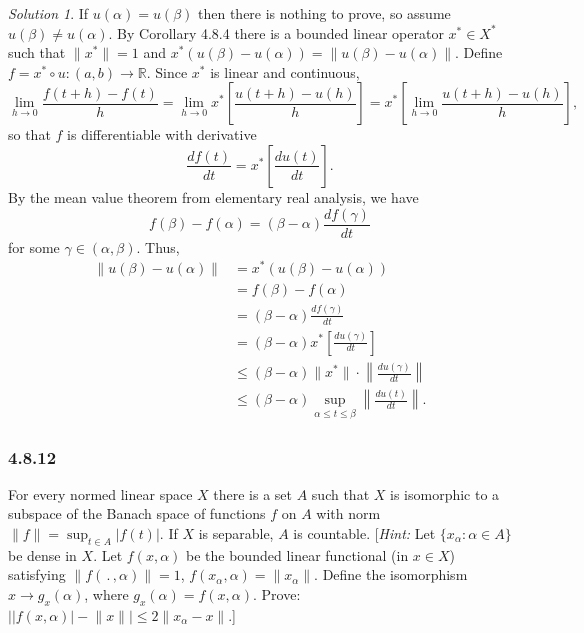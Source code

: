 \documentclass{report}
\newcommand{\bb}[1]{\mathbb{#1}}
\newcommand{\norm}[1]{{\lVert #1 \rVert}}
\newcommand{\snorm}[1]{\left\lVert #1 \right\rVert}
\theoremstyle{remark}
\newtheorem*{solution}{Solution}
\begin{document}
\begin{solution}
  If $u(\alpha) = u(\beta)$ then there is nothing to prove, so assume $u(\beta) \ne u(\alpha)$. By Corollary 4.8.4 there is a bounded linear operator $x^* \in X^*$ such that $\norm{x^*} = 1$ and $x^*(u(\beta) - u(\alpha)) = \norm{u(\beta) - u(\alpha)}$. Define $f = x^* \circ u: (a,b) \to \bb R$. Since $x^*$ is linear and continuous,
  \begin{equation*}
    \lim_{h \to 0} \frac{f(t+h) - f(t)}{h} = \lim_{h \to 0} x^* \left[ \frac{u(t+h) - u(h)}{h} \right] = x^* \left[ \lim_{h \to 0} \frac{u(t+h) - u(h)}{h} \right],
  \end{equation*}
  so that $f$ is differentiable with derivative
  \begin{equation*}
    \frac{df(t)}{dt} = x^* \left[ \frac{du(t)}{dt} \right].
  \end{equation*}
  By the mean value theorem from elementary real analysis, we have
  \begin{equation*}
    f(\beta) - f(\alpha) = (\beta - \alpha) \frac{df(\gamma)}{dt}
  \end{equation*}
  for some $\gamma \in (\alpha, \beta)$. Thus,
  \begin{equation*}
    \begin{split}
      \norm{u(\beta) - u(\alpha)} &= x^*(u(\beta) - u(\alpha)) \\
      &= f(\beta) - f(\alpha) \\
      &= (\beta - \alpha) \frac{df(\gamma)}{dt} \\
      &= (\beta - \alpha) x^* \left[ \frac{du(\gamma)}{dt} \right] \\
      &\le (\beta - \alpha) \norm{x^*} \cdot \snorm{\frac{du(\gamma)}{dt}} \\
      &\le (\beta - \alpha) \sup_{\alpha \le t \le \beta} \snorm{\frac{du(t)}{dt}}.
    \end{split}
  \end{equation*}
\end{solution}

\subsubsection*{4.8.12}
For every normed linear space $X$ there is a set $A$ such that $X$ is isomorphic to a subspace of the Banach space of functions $f$ on $A$ with norm $\norm f = \sup_{t \in A} |f(t)|$. If $X$ is separable, $A$ is countable. [\emph{Hint:} Let $\{x_\alpha: \alpha \in A\}$ be dense in $X$. Let $f(x,\alpha)$ be the bounded linear functional (in $x \in X$) satisfying $\norm{f(\, . \,,\alpha)} = 1$, $f(x_\alpha, \alpha) = \norm{x_\alpha}$. Define the isomorphism $x \to g_x(\alpha)$, where $g_x(\alpha) = f(x, \alpha)$. Prove: $\big| |f(x,\alpha)| - \norm x \big| \le 2 \norm{x_\alpha - x}$.]
\end{document}
